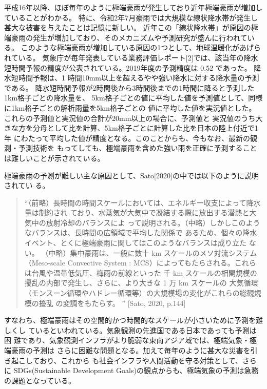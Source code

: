 平成16年以降、ほぼ毎年のように極端豪雨が発生しており近年極端豪雨が増加していることがわかる。
特に、令和2年7月豪雨では大規模な線状降水帯が発生し甚大な被害を与えたことは記憶に新しい。
近年この「線状降水帯」が原因の極端豪雨の発生が増加しており、そのメカニズムや予測研究が盛んに行われている。
このような極端豪雨が増加している原因の1つとして、地球温暖化があげられている。
気象庁が毎年発表している業務評価レポート[2]では、該当年の降水短時間予報の精度が公表されている。2019年度の予測精度は 0.52 であった。
降水短時間予報は、1 時間10mm以上を超えるやや強い降水に対する降水量の予測である。
降水短時間予報が2時間後から3時間後までの1時間に降ると予測した1km格子ごとの降水量を、
5km格子ごとの値に平均した値を予測値として、同様に1km格子ごとの解析雨量を5km格子ごとの
値に平均した値を実況値とした。これらの予測値と実況値の合計が20mm以上の場合に、予測値と
実況値のうち大きな方を分母として比を計算、5km格子ごとに計算した比を日本の陸上付近で1年
にわたって平均した値が精度となる。このことからも、今もなお、最新の観測・予測技術を
もってしても、極端豪雨を含めた強い雨を正確に予測することは難しいことが示されている。

極端豪雨の予測が難しい主な原因として、Sato[2020]の中では以下のように説明されてい
る。

\begin{quote}
“（前略）長時間の時間スケールにおいては、エネルギー収支によって降水量は制約され
ており、水蒸気が大気中で凝結する際に放出する潜熱と大気中の放射冷却のバランスによ
って説明される。（中略）しかしこのようなバランスは、長時間の広領域で平均した関係で
あるため、個々の降水イベント、とくに極端豪雨に関してはこのようなバランスは成り立た
ない。
（中略）集中豪雨は、一般に数十 km スケールのメソ対流システム（Meso-scale Convective
System : MCS）によってもたらされる。これらは台風や温帯低気圧、梅雨の前線といった
千 km スケールの相関規模の擾乱の内部で発生し、さらに、より大きな 1 万 km スケールの
大気循環（モンスーン循環やハドレー循環等）の大規模場の変化がこれらの総観規模の擾乱
の変調をもたらす。
” [Sato, 2020, p.144]
\end{quote}

すなわち、極端豪雨はその空間的かつ時間的なスケールが小さいために予測を難しくし
ているといわれている。気象観測の先進国である日本であっても予測は困
難であり、気象観測インフラがより脆弱な東南アジア域では、極端気象・極端豪雨の予測は
さらに困難な問題となる。加えて毎年のように甚大な災害を引き起こしており、これから
も社会インフラや人間活動を守る対策として、さらに SDGs(Sustainable Development
Goals)の観点からも、極端気象の予測は急務の課題となっている。

